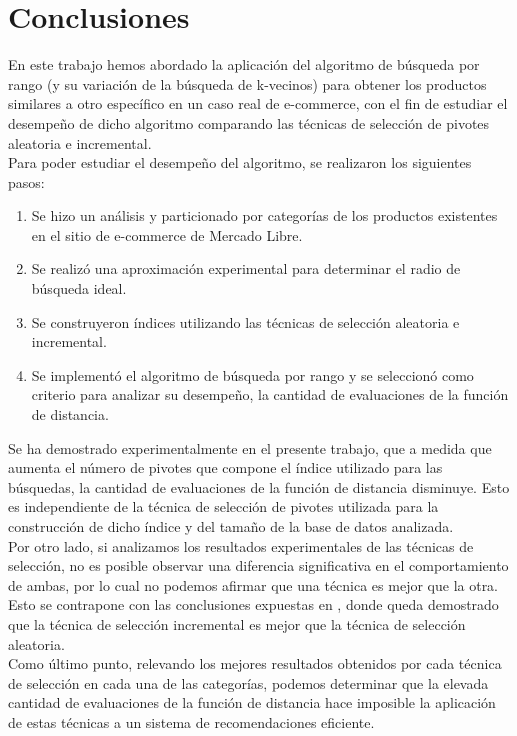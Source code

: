 \chapter{Conclusiones}

En este trabajo hemos abordado la aplicaci\'on del algoritmo de b\'usqueda por rango (y su variaci\'on de la b\'usqueda de k-vecinos) para obtener los productos similares a otro espec\'ifico en un caso real de e-commerce, con el fin de estudiar el desempeño de dicho algoritmo comparando las t\'ecnicas de selecci\'on de pivotes aleatoria e incremental.\\

Para poder estudiar el desempeño del algoritmo, se realizaron los siguientes pasos:

\begin{enumerate}
\item Se hizo un an\'alisis y particionado por categor\'ias de los productos existentes en el sitio de e-commerce de Mercado Libre.
\item Se realiz\'o una aproximaci\'on experimental para determinar el radio de b\'usqueda ideal.
\item Se construyeron \'indices utilizando las t\'ecnicas de selecci\'on aleatoria e incremental.
\item Se implement\'o el algoritmo de b\'usqueda por rango y  se seleccion\'o como criterio para analizar su desempeño, la cantidad de evaluaciones de la funci\'on de distancia.
\end{enumerate}

Se ha demostrado experimentalmente en el presente trabajo, que a medida que aumenta el n\'umero de pivotes que compone el \'indice utilizado para las b\'usquedas, la cantidad de evaluaciones de la funci\'on de distancia disminuye. Esto es independiente de la t\'ecnica de selecci\'on de pivotes utilizada para la construcci\'on de dicho \'indice y del tamaño de la base de datos analizada.\\

Por otro lado, si analizamos los resultados experimentales de las t\'ecnicas de selecci\'on, no es posible observar una diferencia significativa en el comportamiento de ambas, por lo cual no podemos afirmar que una t\'ecnica es mejor que la otra. Esto se contrapone con las conclusiones expuestas en \cite{BNCsccc01}, donde queda demostrado que la t\'ecnica de selecci\'on incremental es mejor que la t\'ecnica de selecci\'on aleatoria.\\

Como \'ultimo punto, relevando los mejores resultados obtenidos por cada t\'ecnica de selecci\'on en cada una de las categor\'ias, podemos determinar que la elevada cantidad de evaluaciones de la funci\'on de distancia hace imposible la aplicaci\'on de estas t\'ecnicas a un sistema de recomendaciones eficiente.\\

